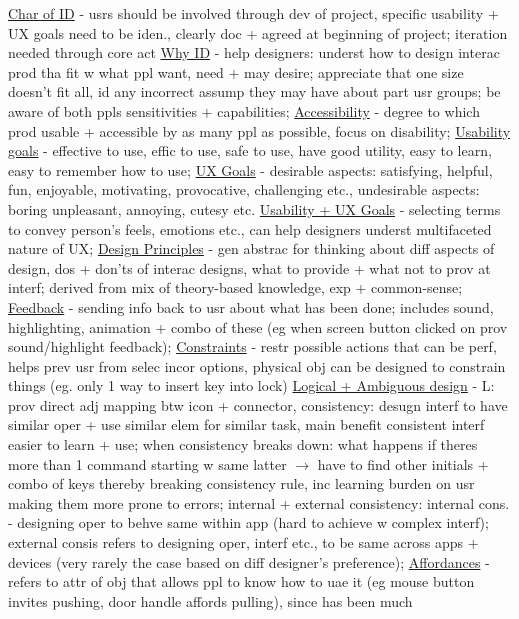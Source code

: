 \documentclass[a4paper]{article}
\begin{document}
\begin{multicols}{3}
        \underline{Char of ID} - usrs should be involved through dev of project, specific usability + UX goals need to be iden., clearly doc + agreed at beginning of project;
        iteration needed through core act
        \underline{Why ID} - help designers: underst how to design interac prod tha fit w what ppl want, need + may desire; appreciate that one size doesn't fit all, id
        any incorrect assump they may have about part usr groups; be aware of both ppls sensitivities + capabilities;
        \underline{Accessibility} - degree to which prod usable + accessible by as many ppl as possible, focus on disability;
        \underline{Usability goals} - effective to use, effic to use, safe to use, have good utility, easy to learn, easy to remember how to use;
        \underline{UX Goals} - desirable aspects: satisfying, helpful, fun, enjoyable, motivating, provocative, challenging etc., undesirable aspects: boring unpleasant, annoying, cutesy etc.
        \underline{Usability + UX Goals} - selecting terms to convey person's feels, emotions etc., can help designers underst multifaceted nature of UX;
        \underline{Design Principles} - gen abstrac for thinking about diff aspects of design, dos + don'ts of interac designs, what to provide + what not to prov at
        interf; derived from mix of theory-based knowledge, exp + common-sense;
        \underline{Feedback} - sending info back to usr about what has been done; includes sound, highlighting, animation + combo of these (eg when screen
        button clicked on prov sound/highlight feedback);
        \underline{Constraints} - restr possible actions that can be perf, helps prev usr from selec incor options, physical obj can be designed to constrain things (eg. only 1 way to insert key into lock)
        \underline{Logical + Ambiguous design} - L: prov direct adj mapping btw icon + connector, consistency: desugn interf to have similar oper + use similar elem for similar
        task, main benefit consistent interf easier to learn + use; when consistency breaks down: what happens if theres more than 1 command starting w same latter $\to$ have to find
        other initials + combo of keys thereby breaking consistency rule, inc learning burden on usr making them more prone to errors; internal + external consistency: internal
        cons. - designing oper to behve same within app (hard to achieve w complex interf); external consis refers to designing oper, interf etc., to be same across apps +
        devices (very rarely the case based on diff designer's preference);
        \underline{Affordances} - refers to attr of obj that allows ppl to know how to uae it (eg mouse button invites pushing, door handle affords pulling), since has been much

\end{multicols}
\end{document}
